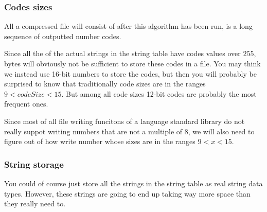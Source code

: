\begin{refsection}
\begin{algorithm}[H]
\begin{algorithmic}[1]
        \EndIf


      \EndIf


    \EndWhile

    \State {}
    \State {}

  \end{algorithmic}
\end{algorithm}

\subsubsection{Codes sizes}

All a \lzw compressed file will consist of after this algorithm has
been run, is a long sequence of outputted number codes.

Since all the of the actual strings in the string table have codes
values over $255$, bytes will obviously not be sufficient to store
these codes in a file. You may think we instead use 16-bit numbers to
store the codes, but then you will probably be surprised to know that
traditionally code sizes are in the ranges $9 <
codeSize < 15$. But among all code sizes 12-bit codes are probably the
most frequent ones.

Since most of all file writing funcitons of a language standard
library do not really suppot writing numbers that are not a multiple
of 8, we will also need to figure out of how write number whose sizes
are in the ranges $9 < x < 15$.

\subsubsection{String storage}

\newcommand{\strpair}[2]{(#1,#2)}

You could of course just store all the strings in the string table as
real string data types. However, these strings are going to end up
taking way more space than they really need to.


\end{refsection}

